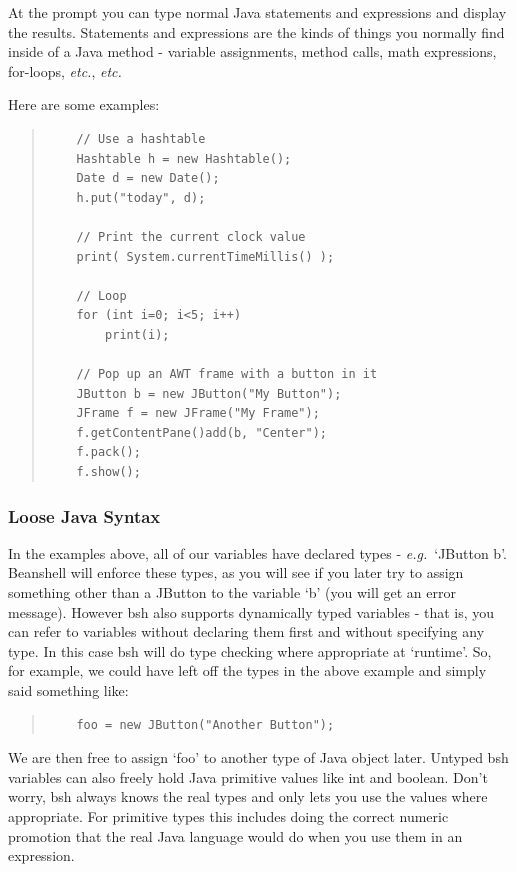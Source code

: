 \documentclass[twoside,11pt]{article}
\renewcommand{\_}{\texttt{\symbol{95}}}
\newcommand{\eg}{\textit{e.g.}}
\newcommand{\etc}{\textit{etc.}}
\begin{document}
At the prompt you can type normal Java statements and expressions and
display the results.
Statements and expressions are the kinds of things you normally find
inside of a Java method - variable assignments, method calls, math
expressions, for-loops, \etc, \etc

Here are some examples:
\begin{quote}
\begin{verbatim}
    // Use a hashtable
    Hashtable h = new Hashtable();
    Date d = new Date();
    h.put("today", d);

    // Print the current clock value
    print( System.currentTimeMillis() );

    // Loop
    for (int i=0; i<5; i++)
        print(i);

    // Pop up an AWT frame with a button in it
    JButton b = new JButton("My Button");
    JFrame f = new JFrame("My Frame");
    f.getContentPane()add(b, "Center");
    f.pack();
    f.show();
\end{verbatim}
\end{quote}

\subsubsection{Loose Java Syntax}

In the examples above, all of our variables have declared types -
\eg\ `JButton b'.  Beanshell will enforce these types, as you will see if
you later try to assign something other than a JButton to the variable
`b' (you will get an error message).  However bsh also supports
dynamically typed variables - that is, you can refer to variables
without declaring them first and without specifying any type.  In this
case bsh will do type checking where appropriate at `runtime'.  So,
for example, we could have left off the types in the above example and
simply said something like:
\begin{quote}
\begin{verbatim}
    foo = new JButton("Another Button");
\end{verbatim}
\end{quote}

We are then free to assign `foo' to another type of Java object later.
Untyped bsh variables can also freely hold Java primitive values like int
and boolean.  Don't worry, bsh always knows the real types and only lets you
use the values where appropriate.  For primitive types this includes doing the
correct numeric promotion that the real Java language would do when you use
them in an expression.
\end{document}

